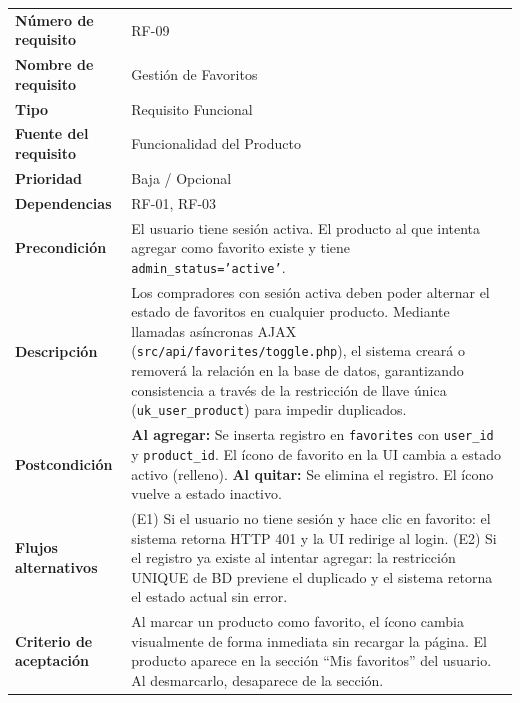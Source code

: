 \documentclass[11pt,a4paper]{report}
\begin{document}
\begin{table}[H]
\centering
\begin{tabularx}{\textwidth}{|l|L|}
\hline
{} \\ \hline
\textbf{Número de requisito} & RF-09 \\ \hline
\textbf{Nombre de requisito} & Gestión de Favoritos \\ \hline
\textbf{Tipo} & Requisito Funcional \\ \hline
\textbf{Fuente del requisito} & Funcionalidad del Producto \\ \hline
\textbf{Prioridad} & Baja / Opcional \\ \hline
\textbf{Dependencias} & RF-01, RF-03 \\ \hline
\textbf{Precondición} & El usuario tiene sesión activa. El producto al que intenta agregar como favorito existe y tiene \texttt{admin\_status='active'}. \\ \hline
\textbf{Descripción} & Los compradores con sesión activa deben poder alternar el estado de favoritos en cualquier producto. Mediante llamadas asíncronas AJAX (\texttt{src/api/favorites/toggle.php}), el sistema creará o removerá la relación en la base de datos, garantizando consistencia a través de la restricción de llave única (\texttt{uk\_user\_product}) para impedir duplicados. \\ \hline
\textbf{Postcondición} & \textbf{Al agregar:} Se inserta registro en \texttt{favorites} con \texttt{user\_id} y \texttt{product\_id}. El ícono de favorito en la UI cambia a estado activo (relleno). \textbf{Al quitar:} Se elimina el registro. El ícono vuelve a estado inactivo. \\ \hline
\textbf{Flujos alternativos} & (E1) Si el usuario no tiene sesión y hace clic en favorito: el sistema retorna HTTP 401 y la UI redirige al login. (E2) Si el registro ya existe al intentar agregar: la restricción UNIQUE de BD previene el duplicado y el sistema retorna el estado actual sin error. \\ \hline
\textbf{Criterio de aceptación} & Al marcar un producto como favorito, el ícono cambia visualmente de forma inmediata sin recargar la página. El producto aparece en la sección ``Mis favoritos'' del usuario. Al desmarcarlo, desaparece de la sección. \\ \hline
\end{tabularx}
\end{table}
\end{document}
